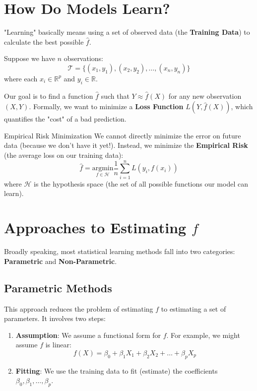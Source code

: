 \documentclass[11pt, a4paper]{article}
\begin{document}
\section{How Do Models Learn?}

"Learning" basically means using a set of observed data (the \textbf{Training Data}) to calculate the best possible $\hat{f}$.

Suppose we have $n$ observations:
\[ \mathcal{T} = \{(x_1, y_1), (x_2, y_2), \dots, (x_n, y_n)\} \]
where each $x_i \in \mathbb{R}^p$ and $y_i \in \mathbb{R}$.

Our goal is to find a function $\hat{f}$ such that $Y \approx \hat{f}(X)$ for any new observation $(X, Y)$. Formally, we want to minimize a \textbf{Loss Function} $L(Y, \hat{f}(X))$, which quantifies the "cost" of a bad prediction.

\begin{mathbox}{Empirical Risk Minimization}
We cannot directly minimize the error on future data (because we don't have it yet!). Instead, we minimize the \textbf{Empirical Risk} (the average loss on our training data):
\[ \hat{f} = \underset{f \in \mathcal{H}}{\text{argmin}} \frac{1}{n} \sum_{i=1}^{n} L(y_i, f(x_i)) \]
where $\mathcal{H}$ is the hypothesis space (the set of all possible functions our model can learn).
\end{mathbox}

\section{Approaches to Estimating $f$}

Broadly speaking, most statistical learning methods fall into two categories: \textbf{Parametric} and \textbf{Non-Parametric}.

\subsection{Parametric Methods}
This approach reduces the problem of estimating $f$ to estimating a set of parameters. It involves two steps:
\begin{enumerate}
    \item \textbf{Assumption}: We assume a functional form for $f$. For example, we might assume $f$ is linear:
    \[ f(X) = \beta_0 + \beta_1 X_1 + \beta_2 X_2 + \dots + \beta_p X_p \]
    \item \textbf{Fitting}: We use the training data to fit (estimate) the coefficients $\beta_0, \beta_1, \dots, \beta_p$.
\end{enumerate}
\end{document}
